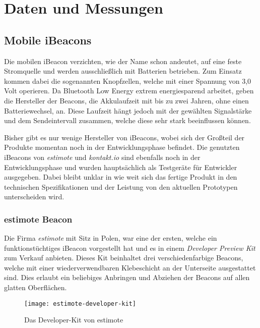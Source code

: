 \chapter{Daten und Messungen}
\label{chap:dataandmeasure}

\section{Mobile iBeacons}
\label{sec:dataandmeasurement:mobilebeacon}
Die mobilen iBeacon verzichten, wie der Name schon andeutet, auf eine feste Stromquelle und werden ausschließlich mit Batterien betrieben.
Zum Einsatz kommen dabei die sogenannten Knopfzellen, welche mit einer Spannung von 3,0 Volt operieren.
Da Bluetooth Low Energy extrem energiesparend arbeitet, geben die Hersteller der Beacons, die Akkulaufzeit mit bis zu zwei Jahren, ohne einen Batteriewechsel, an. Diese Laufzeit hängt jedoch mit der gewählten Signalstärke und dem Sendeintervall zusammen, welche diese sehr stark beeinflussen können.

Bisher gibt es nur wenige Hersteller von iBeacons, wobei sich der Großteil der Produkte momentan noch in der Entwicklungsphase befindet. Die genutzten iBeacons von \emph{estimote} und \emph{kontakt.io} sind ebenfalls noch in der Entwicklungsphase und wurden hauptsächlich als Testgeräte für Entwickler ausgegeben. Dabei bleibt unklar in wie weit sich das fertige Produkt in den technischen Spezifikationen und der Leistung von den aktuellen Prototypen unterscheiden wird.

\subsection{estimote Beacon}
\label{sec:dataandmeasurement:mobilebeacon:estimote}
Die Firma \emph{estimote} \cite{estimote} mit Sitz in Polen, war eine der ersten, welche ein funktionstüchtiges iBeacon vorgestellt hat und es in einem \emph{Developer Preview Kit} zum Verkauf anbieten.
Dieses Kit beinhaltet drei verschiedenfarbige Beacons, welche mit einer wiederverwendbaren Klebeschicht an der Unterseite ausgestattet sind. Dies erlaubt ein beliebiges Anbringen und Abziehen der Beacons auf allen glatten Oberflächen.
\begin{figure}[htb!]
		\centering
	\texttt{[image: estimote-developer-kit]}
	\caption{Das Developer-Kit von estimote}
	\label{estimote-developer-kit}
\end{figure}

